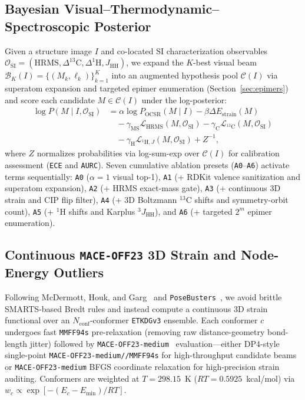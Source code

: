 \documentclass[10pt,twocolumn]{article}
\begin{document}
\subsection{Bayesian Visual--Thermodynamic--Spectroscopic Posterior}
\label{sec:posterior}

Given a structure image $I$ and co-located SI characterization observables $\mathcal{O}_{\text{SI}} = (\text{HRMS}, \Delta^{13}\text{C}, \Delta^{1}\text{H}, J_{\text{HH}})$, we expand the $K$-best visual beam $\mathcal{B}_K(I) = \{(M_k, \ell_k)\}_{k=1}^K$ into an augmented hypothesis pool $\mathcal{C}(I)$ via superatom expansion and targeted epimer enumeration (Section~\ref{sec:epimers}) and score each candidate $M \in \mathcal{C}(I)$ under the log-posterior:
\begin{align}
  \log P(M \mid I, \mathcal{O}_{\text{SI}}) &= \alpha \log P_{\text{OCSR}}(M \mid I) - \beta \Delta E_{\text{strain}}(M) \nonumber\\
  &\quad - \gamma_{\text{MS}} \mathcal{L}_{\text{HRMS}}(M, \mathcal{O}_{\text{SI}}) - \gamma_{\text{C}} \mathcal{L}_{^{13}\text{C}}(M, \mathcal{O}_{\text{SI}}) \nonumber\\
  &\quad - \gamma_{\text{H}} \mathcal{L}_{^{1}\text{H},J}(M, \mathcal{O}_{\text{SI}}) + Z^{-1},
  \label{eq:posterior}
\end{align}
where $Z$ normalizes probabilities via log-sum-exp over $\mathcal{C}(I)$ for calibration assessment (\texttt{ECE} and \texttt{AURC}). Seven cumulative ablation presets (\texttt{A0}--\texttt{A6}) activate terms sequentially: \texttt{A0} ($\alpha=1$ visual top-1), \texttt{A1} (+ RDKit valence sanitization and superatom expansion), \texttt{A2} (+ HRMS exact-mass gate), \texttt{A3} (+ continuous 3D strain and CIP flip filter), \texttt{A4} (+ 3D Boltzmann $^{13}\text{C}$ shifts and symmetry-orbit count), \texttt{A5} (+ $^{1}\text{H}$ shifts and Karplus $^3J_{\text{HH}}$), and \texttt{A6} (+ targeted $2^m$ epimer enumeration).

\subsection{Continuous \texttt{MACE-OFF23} 3D Strain and Node-Energy Outliers}
\label{sec:strain}

Following McDermott, Houk, and Garg~\cite{McDermott2024AntiBredt} and \texttt{PoseBusters}~\cite{Buttenschoen2024PoseBusters}, we avoid brittle SMARTS-based Bredt rules and instead compute a continuous 3D strain functional over an $N_{\text{conf}}$-conformer \texttt{ETKDGv3} ensemble. Each conformer $c$ undergoes fast \texttt{MMFF94s} pre-relaxation (removing raw distance-geometry bond-length jitter) followed by \texttt{MACE-OFF23-medium}~\cite{Kovacs2025MACEOFF} evaluation---either DP4-style single-point \texttt{MACE-OFF23-medium//MMFF94s} for high-throughput candidate beams or \texttt{MACE-OFF23-medium} BFGS coordinate relaxation for high-precision strain auditing. Conformers are weighted at $T=298.15$~K ($RT = 0.5925$~kcal/mol) via $w_c \propto \exp[-(E_c - E_{\min})/RT]$.
\end{document}
